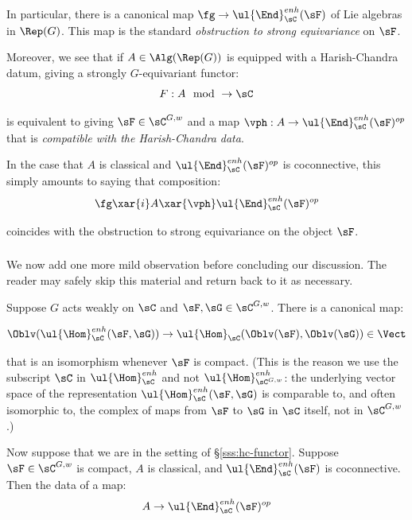 \begin{rem}
\notready

In particular, there is a canonical map
$\fg \to \ul{\End}_{\sC}^{enh}(\sF)$ of Lie algebras in $\Rep(G)$.
This map is the standard \emph{obstruction to strong equivariance}
on $\sF$.

\end{rem}

Moreover, we see that if $A \in \Alg(\Rep(G))$ is equipped with a Harish-Chandra
datum, giving a strongly $G$-equivariant functor:
%
\[
F:A\mod \to \sC
\]

 is equivalent to giving $\sF \in \sC^{G,w}$ and
a map $\vph:A \to \ul{\End}_{\sC}^{enh}(\sF)^{op}$ that is
\emph{compatible with the Harish-Chandra data}.

In the case that $A$ is classical and $\ul{\End}_{\sC}^{enh}(\sF)^{op}$
is coconnective, this simply amounts to saying that composition:
%
\[
\fg \xar{i} A \xar{\vph} \ul{\End}_{\sC}^{enh}(\sF)^{op}
\]

 coincides with the obstruction to strong equivariance on the object $\sF$.

\subsubsection{}\label{sss:connected-obstr}

We now add one more mild observation before concluding our discussion. The
reader may safely skip this material and return back to it as necessary.

Suppose $G$ acts weakly on $\sC$ and $\sF,\sG \in \sC^{G,w}$.
There is a canonical map:

\[
\Oblv(\ul{\Hom}_{\sC}^{enh}(\sF,\sG)) \to \ul{\Hom}_{\sC}(\Oblv(\sF),\Oblv(\sG))
\in \Vect
\]

 that is an isomorphism whenever $\sF$ is compact. (This is the
reason we use the subscript $\sC$ in $\ul{\Hom}_{\sC}^{enh}$ and
not $\ul{\Hom}_{\sC^{G,w}}^{enh}$: the underlying vector space
of the representation $\ul{\Hom}_{\sC}^{enh}(\sF,\sG)$ is
comparable to, and often isomorphic to, the complex of maps
from $\sF$ to $\sG$ in $\sC$ itself, not in $\sC^{G,w}$.)

Now suppose that we are in the setting of \S \ref{sss:hc-functor}.
Suppose $\sF \in \sC^{G,w}$ is compact, $A$ is classical, and
$\ul{\End}_{\sC}^{enh}(\sF)$ is coconnective. Then the data
of a map:
%
\[
A \to \ul{\End}_{\sC}^{enh}(\sF)^{op}
\]

